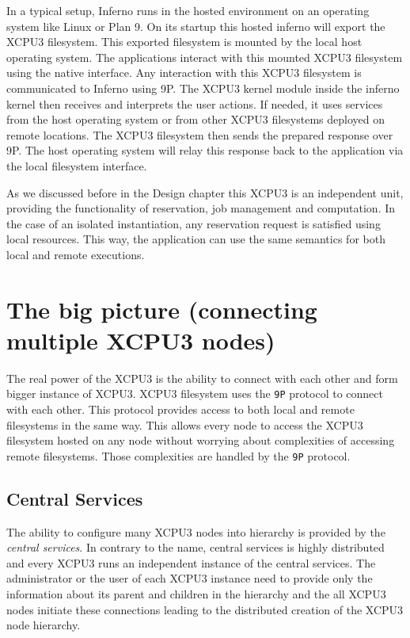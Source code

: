In a typical setup, Inferno runs in the hosted environment on an operating system like Linux
or Plan 9.  On its startup this hosted inferno will export the XCPU3 filesystem.
This exported filesystem is mounted by the local host operating system.  
The applications interact with this mounted XCPU3 filesystem using the native interface.
Any interaction with this XCPU3 filesystem is communicated to Inferno using 9P.
The XCPU3 kernel module inside the inferno kernel then receives and interprets the 
user actions.  If needed, it uses services from the host operating system or from
other XCPU3 filesystems deployed on remote locations. The XCPU3 filesystem then 
sends the prepared response over 9P. The host operating system will relay this
response back to the application via the local filesystem interface.


As we discussed before in the Design chapter this XCPU3 is an independent unit, providing
the functionality of reservation, job management and computation.  In the case of an
isolated instantiation, any reservation request is satisfied using local resources.
This way, the application can use the same semantics for both local and remote executions.

\section{The big picture (connecting multiple XCPU3 nodes)}
The real power of the XCPU3 is the ability to connect with each other and form bigger
instance of XCPU3.  XCPU3 filesystem uses the \texttt{9P} protocol to connect with each
other.  This protocol provides access to both local and remote filesystems in 
the same way.  This allows every node to access the XCPU3 filesystem hosted on any node
without worrying about complexities of accessing remote filesystems.  Those
complexities are handled by the \texttt{9P} protocol.


\subsection{Central Services}

The ability to configure many XCPU3 nodes into hierarchy is provided by the
\textit{central services}.  In contrary to the name, central services is
highly distributed and every XCPU3 runs an independent instance of the central
services.  The administrator or the user of each XCPU3 instance need to
provide only the information about its parent and children in the hierarchy and
the all XCPU3 nodes initiate these connections leading to the distributed
creation of the XCPU3 node hierarchy.



